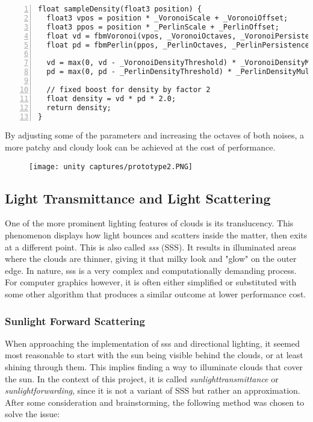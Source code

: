 \begin{lstlisting}[language=HLSL, numbers=left, caption=Implementation of a density sampling function., label=lst:shader:prototype:sampledensity]
float sampleDensity(float3 position) {
  float3 vpos = position * _VoronoiScale + _VoronoiOffset;
  float3 ppos = position * _PerlinScale + _PerlinOffset;
  float vd = fbmVoronoi(vpos, _VoronoiOctaves, _VoronoiPersistence));
  float pd = fbmPerlin(ppos, _PerlinOctaves, _PerlinPersistence));
  
  vd = max(0, vd - _VoronoiDensityThreshold) * _VoronoiDensityMultiplier;
  pd = max(0, pd - _PerlinDensityThreshold) * _PerlinDensityMultiplier;
  
  // fixed boost for density by factor 2
  float density = vd * pd * 2.0;
  return density;
}
\end{lstlisting}

\noindent
By adjusting some of the \gls{parameters} and increasing the octaves of both noises, a more patchy and cloudy look can be achieved at the cost of performance.

\begin{figure}[H]
    \centering
    \texttt{[image: unity captures/prototype2.PNG]}
    \label{img:captures:prototype2}
\end{figure}

\clearpage
\subsection{Light Transmittance and Light Scattering}
One of the more prominent lighting features of clouds is its translucency. This phenomenon displays how light bounces and scatters inside the matter, then exits at a different point. This is also called \textit{\gls{sss}} (SSS).
It results in illuminated areas where the clouds are thinner, giving it that milky look and "glow" on the outer edge. In nature, \gls{sss} is a very complex and computationally demanding process. For computer graphics however, it is often either simplified or substituted with some other algorithm that produces a similar outcome at lower performance cost.

\subsubsection{Sunlight Forward Scattering}
When approaching the implementation of \gls{sss} and directional lighting, it seemed most reasonable to start with the sun being visible behind the clouds, or at least shining through them.
This implies finding a way to illuminate clouds that cover the sun. In the context of this project, it is called \textit{\gls{sunlighttransmittance}} or \textit{\gls{sunlightforwarding}}, since it is not a variant of SSS but rather an approximation.
\\
After some consideration and brainstorming, the following method was chosen to solve the issue:

